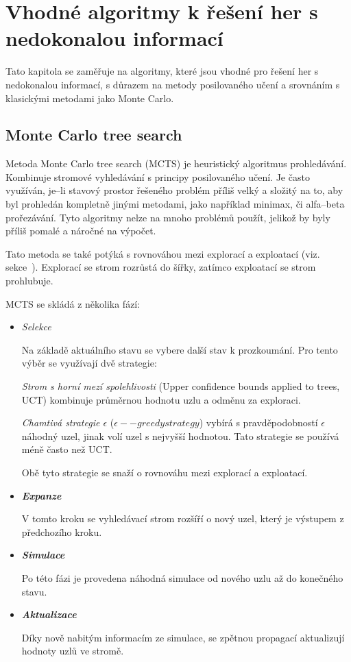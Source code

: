 \section{Vhodné algoritmy k řešení her s nedokonalou informací}\label{sec:vhodne-algoritmy-k-reseni-her-s-nedokonalou-informaci}

Tato kapitola se zaměřuje na algoritmy, které jsou vhodné pro řešení her s nedokonalou informací, s důrazem na metody posilovaného učení a srovnáním s klasickými metodami jako Monte Carlo.

\subsection{Monte Carlo tree search}\label{subsec:monte-carlo-tree-search}
Metoda Monte Carlo tree search (MCTS) je heuristický algoritmus prohledávání.
Kombinuje stromové vyhledávání s principy posilovaného učení.
Je často využíván, je--li stavový prostor řešeného problém příliš velký a složitý na to, aby byl prohledán kompletně jinými metodami, jako například minimax, či alfa--beta prořezávání.
Tyto  algoritmy nelze na mnoho problémů použít, jelikož by byly příliš pomalé a náročné na výpočet.

Tato metoda se také potýká s rovnováhou mezi explorací a exploatací (viz.~ sekce~).
Explorací se strom rozrůstá do šířky, zatímco exploatací se strom prohlubuje.

MCTS se skládá z několika fází:
\begin{itemize}
  \item \emph{Selekce}

  Na základě aktuálního stavu se vybere další stav k prozkoumání.
  Pro tento výběr se využívají dvě strategie:
  
  \emph{Strom s horní mezí spolehlivosti} (Upper confidence bounds applied to trees, UCT) kombinuje průměrnou hodnotu uzlu a odměnu za exploraci.

  \label{epsilon_greedy}
  \emph{Chamtivá strategie $\epsilon$ } ($\epsilon--greedy strategy$) vybírá s pravděpodobností $\epsilon$ náhodný uzel, jinak volí uzel s nejvyšší hodnotou.
  Tato strategie se používá méně často než UCT\@.

  Obě tyto strategie se snaží o rovnováhu mezi explorací a exploatací.
  \item \textbf{\emph{Expanze}}

  V tomto kroku se vyhledávací strom rozšíří o nový uzel, který je výstupem z předchozího kroku.

  \item \textbf{\emph{Simulace}}

  Po této fázi je provedena náhodná simulace od nového uzlu až do konečného stavu.

  \item \textbf{\emph{Aktualizace}}
  
  Díky nově nabitým informacím ze simulace, se zpětnou propagací aktualizují hodnoty uzlů ve stromě.

\end{itemize}

